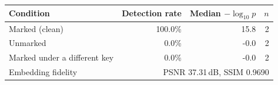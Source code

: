 \begin{tabular}{lrrr}
\toprule
Condition & Detection rate & Median $-\log_{10}p$ & $n$ \\
\midrule
Marked (clean) & 100.0\% & 15.8 & 2 \\
Unmarked & 0.0\% & -0.0 & 2 \\
Marked under a different key & 0.0\% & -0.0 & 2 \\
\midrule
Embedding fidelity & \multicolumn{3}{r}{PSNR 37.31\,dB, SSIM 0.9690} \\
\bottomrule
\end{tabular}
